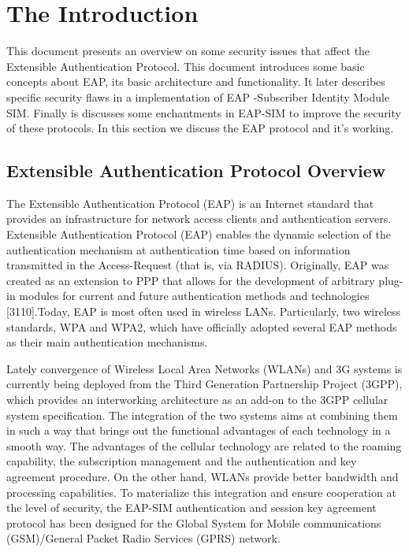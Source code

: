 \chapter{The Introduction}

This document presents an overview on some security issues that affect the Extensible Authentication Protocol.
This document introduces some basic concepts about EAP, its basic architecture and functionality. It later describes specific security flaws in a implementation of EAP -Subscriber Identity Module SIM. Finally is discusses some enchantments in EAP-SIM to improve the security of these protocols. In this section we discuss the EAP protocol and it's working.
 
\section{Extensible Authentication Protocol Overview} 

The Extensible Authentication Protocol (EAP) is an Internet standard that provides an infrastructure for network access clients and authentication servers. Extensible Authentication Protocol (EAP) enables the dynamic selection of the authentication mechanism at authentication time based on information transmitted in the Access-Request (that is, via RADIUS). Originally, EAP was created as an extension to PPP that allows for the development of arbitrary 
plug-in modules for current and future authentication methods and technologies [3110].Today, EAP is most often used in wireless LANs. Particularly, two wireless standards, WPA and WPA2, which have officially adopted several EAP 
methods as their main authentication mechanisms. 

Lately convergence of Wireless Local Area Networks (WLANs) and 3G systems is currently being deployed from the Third Generation Partnership Project (3GPP), which provides an interworking architecture as an add-on to the 3GPP cellular system specification. The integration of the two systems aims at combining them in such a way that brings out the functional advantages of each technology in a smooth way. The advantages of the cellular technology are related to the roaming capability, the subscription management and the authentication and key agreement procedure. On the other hand, WLANs provide better bandwidth and processing capabilities. To materialize this integration and ensure cooperation at the level of security, the EAP-SIM authentication and session key agreement protocol has been designed for the Global System for Mobile communications (GSM)/General Packet Radio Services (GPRS) network.


